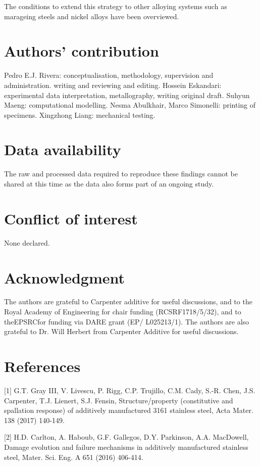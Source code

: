 \documentclass[10pt]{article}
\begin{document}
The conditions to extend this strategy to other alloying systems such as marageing steels and nickel alloys have been overviewed.

\section*{Authors' contribution}
Pedro E.J. Rivera: conceptualisation, methodology, supervision and administration. writing and reviewing and editing. Hossein Eskandari: experimental data interpretation, metallography, writing original draft. Suhyun Maeng: computational modelling. Nesma Abulkhair, Marco Simonelli: printing of specimens. Xingzhong Liang: mechanical testing.

\section*{Data availability}
The raw and processed data required to reproduce these findings cannot be shared at this time as the data also forms part of an ongoing study.

\section*{Conflict of interest}
None declared.

\section*{Acknowledgment}
The authors are grateful to Carpenter additive for useful discussions, and to the Royal Academy of Engineering for chair funding (RCSRF1718/5/32), and to theEPSRCfor funding via DARE grant (EP/ L025213/1). The authors are also grateful to Dr. Will Herbert from Carpenter Additive for useful discussions.

\section*{References}
[1] G.T. Gray III, V. Livescu, P. Rigg, C.P. Trujillo, C.M. Cady, S.-R. Chen, J.S. Carpenter, T.J. Lienert, S.J. Fensin, Structure/property (constitutive and spallation response) of additively manufactured 3161 stainless steel, Acta Mater. 138 (2017) 140-149.

[2] H.D. Carlton, A. Haboub, G.F. Gallegos, D.Y. Parkinson, A.A. MacDowell, Damage evolution and failure mechanisms in additively manufactured stainless steel, Mater. Sci. Eng. A 651 (2016) 406-414.
\end{document}
